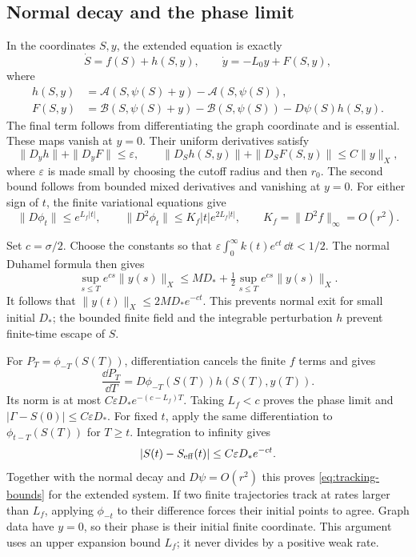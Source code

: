 \subsection{Normal decay and the phase limit}

In the coordinates $S,y$, the extended equation is exactly
\begin{equation}\label{eq:normal-graph-equations}
 \dot S=f(S)+h(S,y),\qquad \dot y=-L_0y+F(S,y),
\end{equation}
where
\[
 \begin{split}
 h(S,y)&=\mathcal A(S,\psi(S)+y)-\mathcal A(S,\psi(S)),\\
 F(S,y)&=\mathcal B(S,\psi(S)+y)-\mathcal B(S,\psi(S))
                                                -D\psi(S)h(S,y).
 \end{split}
\]
The final term follows from differentiating the graph
coordinate and is essential. These maps vanish at $y=0$.
Their uniform derivatives satisfy
\begin{equation}\label{eq:normal-coupling-bounds}
 \|D_yh\|+\|D_yF\|\le\varepsilon,
 \qquad
 \|D_Sh(S,y)\|+\|D_SF(S,y)\|\le C\|y\|_X,
\end{equation}
where $\varepsilon$ is made small by choosing the cutoff
radius and then $r_0$. The second bound follows from
bounded mixed derivatives and vanishing at $y=0$.
For either sign of $t$, the finite variational equations give
\begin{equation}\label{eq:finite-backflow-bounds}
 \|D\phi_t\|\le e^{L_f|t|},\qquad
 \|D^2\phi_t\|\le K_f|t|e^{2L_f|t|},
 \qquad K_f=\|D^2f\|_\infty=O(r^2).
\end{equation}

Set $c=\sigma/2$. Choose the constants so that
$\varepsilon\int_0^\infty k(t)e^{ct}\,\dd t<1/2$.
The normal Duhamel formula then gives
\[
 \sup_{s\le T}e^{cs}\|y(s)\|_X
 \le MD_*+\tfrac12\sup_{s\le T}e^{cs}\|y(s)\|_X.
\]
It follows that $\|y(t)\|_X\le2MD_*e^{-ct}$.
This prevents normal exit for small initial $D_*$;
the bounded finite field and the integrable perturbation
$h$ prevent finite-time escape of $S$.

For $P_T=\phi_{-T}(S(T))$, differentiation cancels the
finite $f$ terms and gives
\begin{equation}\label{eq:phase-velocity}
        \frac{\dd P_T}{\dd T}
             =D\phi_{-T}(S(T))h(S(T),y(T)).
\end{equation}
Its norm is at most $C\varepsilon D_*e^{-(c-L_f)T}$.
Taking $L_f<c$ proves the phase limit and
$|\Gamma-S(0)|\le C\varepsilon D_*$.
For fixed $t$, apply the same differentiation to
$\phi_{t-T}(S(T))$ for $T\ge t$. Integration to infinity
gives
\begin{equation}\label{eq:finite-coordinate-tracking}
              |S(t)-S_{\rm eff}(t)|\le C\varepsilon D_*e^{-ct}.
\end{equation}
Together with the normal decay and $D\psi=O(r^2)$
this proves \eqref{eq:tracking-bounds} for the extended
system. If two finite trajectories track at rates larger
than $L_f$, applying $\phi_{-t}$ to their difference
forces their initial points to agree. Graph data have
$y=0$, so their phase is their initial finite coordinate.
This argument uses an upper expansion bound $L_f$;
it never divides by a positive weak rate.

